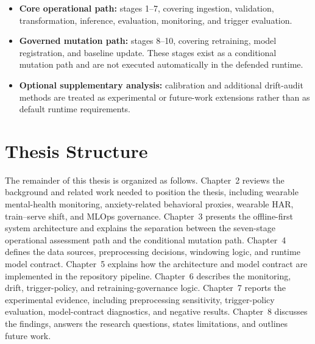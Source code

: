\begin{itemize}
    \item \textbf{Core operational path:} stages 1--7, covering ingestion, validation, transformation, inference, evaluation, monitoring, and trigger evaluation.
    \item \textbf{Governed mutation path:} stages 8--10, covering retraining, model registration, and baseline update. These stages exist as a conditional mutation path and are not executed automatically in the defended runtime.
    \item \textbf{Optional supplementary analysis:} calibration and additional drift-audit methods are treated as experimental or future-work extensions rather than as default runtime requirements.
\end{itemize}
\section{Thesis Structure}

The remainder of this thesis is organized as follows. Chapter~2 reviews the background and related work needed to position the thesis, including wearable mental-health monitoring, anxiety-related behavioral proxies, wearable HAR, train--serve shift, and MLOps governance. Chapter~3 presents the offline-first system architecture and explains the separation between the seven-stage operational assessment path and the conditional mutation path. Chapter~4 defines the data sources, preprocessing decisions, windowing logic, and runtime model contract. Chapter~5 explains how the architecture and model contract are implemented in the repository pipeline. Chapter~6 describes the monitoring, drift, trigger-policy, and retraining-governance logic. Chapter~7 reports the experimental evidence, including preprocessing sensitivity, trigger-policy evaluation, model-contract diagnostics, and negative results. Chapter~8 discusses the findings, answers the research questions, states limitations, and outlines future work.
